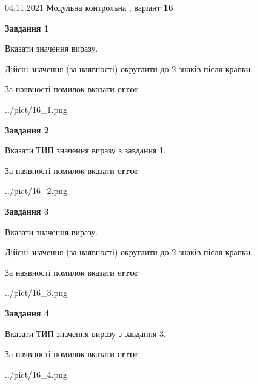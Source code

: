 \documentclass[11pt, ukrainian]{article}
\begin{document}
{04.11.2021 Модульна контрольна , варіант  \No \textbf { 16 }\par}
{
\begin {large}
{\begin {center}\textbf{Завдання 1}\end {center}}\par
Вказати значення виразу. \par
Дійсні значення (за наявності) округлити до 2 знаків після крапки. \par
За наявності помилок вказати \textbf{error}

\begin{center}
	{../pict/16_1.png}
\end{center}
\newpage

{\begin {center}\textbf{Завдання 2}\end {center}}\par
Вказати ТИП значення виразу з завдання 1. \par
За наявності помилок вказати \textbf{error}

\begin{center}
	{../pict/16_2.png}
\end{center}
\newpage

{\begin {center}\textbf{Завдання 3}\end {center}}\par
Вказати значення виразу. \par
Дійсні значення (за наявності) округлити до 2 знаків після крапки. \par
За наявності помилок вказати \textbf{error}

\begin{center}
	{../pict/16_3.png}
\end{center}
\newpage

{\begin {center}\textbf{Завдання 4}\end {center}}\par
Вказати ТИП значення виразу з завдання 3. \par
За наявності помилок вказати \textbf{error}

\begin{center}
	{../pict/16_4.png}
\end{center}
\newpage


\end{large}}
\end{document}
